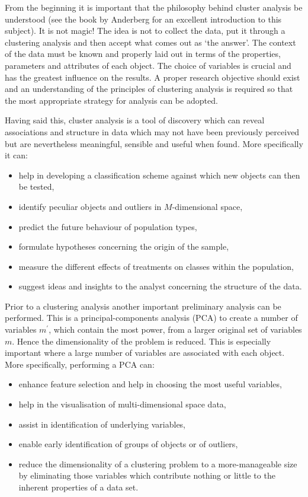 From the beginning it is important that the philosophy behind cluster
analysis be understood (see the book by Anderberg for an excellent
introduction to this subject). It is not magic! The idea is not to
collect the data, put it through a clustering analysis
and then accept what comes out as `the answer'.
The context of the data must be known and properly laid out in terms of
the properties, parameters and attributes of each object. The choice of
variables is crucial and has the greatest influence on the results.
A proper research objective should exist and an understanding of the
principles of clustering analysis is required so that the most
appropriate strategy for analysis can be adopted.

Having said this, cluster analysis is a tool of discovery which can reveal
associations and structure in data which may not have been previously perceived
but are nevertheless meaningful, sensible and useful when found. More
specifically it can:
\begin{itemize}
\item help in developing a classification scheme against which new
objects can then be tested,
\item identify peculiar objects and outliers in $M$-dimensional space,
\item predict the future behaviour of population types,
\item formulate hypotheses concerning the origin of the sample,
\item measure the different effects of treatments on classes within the
population,
\item  suggest ideas and insights to the analyst concerning the structure
of the data.
\end{itemize}
Prior to a clustering analysis another important preliminary analysis can be
performed. This is a principal-components analysis (PCA) to create a number of
variables $m^{\prime}$, which contain the most power, from a larger original
set of variables $m$. Hence the dimensionality of the problem is reduced.
This is especially important where a large number of variables are associated
with each object. More specifically, performing a PCA can:
\begin{itemize}
\item enhance feature selection and help in choosing the most useful variables,
\item help in the visualisation of multi-dimensional space data,
\item assist in identification of underlying variables,
\item enable early identification of groups of objects or of outliers,
\item reduce the dimensionality of a clustering problem to a more-manageable
size by eliminating those variables which contribute nothing or little to the
inherent properties of a data set.
\end{itemize}

